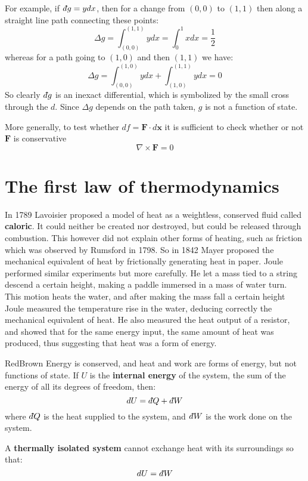\documentclass[a4paper,11pt,oneside]{book}
\newcommand{\dbar}{d\hspace*{-0.08em}\bar{}\hspace*{0.1em}}
\begin{document}
For example, if $\dbar g = y dx$, then for a change from $(0,0)$ to $(1,1)$ then along a straight line path connecting these points:
\begin{equation}
    \Delta g = \int_{(0,0)}^{(1,1)} y dx = \int_0^1 x dx = \frac{1}{2}
\end{equation}
whereas for a path going to $(1,0)$ and then $(1,1)$ we have:
\begin{equation}
    \Delta g = \int_{(0,0)}^{(1,0)} y dx+\int_{(1,0)}^{(1,1)} y dx = 0
\end{equation}
So clearly $\dbar g$ is an inexact differential, which is symbolized by the small cross through the $d$. Since $\Delta g$ depends on the path taken, $g$ is not a function of state. 

More generally, to test whether $df = \textbf{F} \cdot d\textbf{x}$ it is sufficient to check whether or not $\textbf{F}$ is conservative
\begin{equation}
    \nabla \times \textbf{F} = 0
\end{equation}

\section{The first law of thermodynamics}
In 1789 Lavoisier proposed a model of heat as a weightless, conserved fluid called \textbf{caloric}. It could neither be created nor destroyed, but could be released through combustion.
This however did not explain other forms of heating, such as friction which was observed by Rumsford in 1798. So in 1842 Mayer proposed the mechanical equivalent of heat by frictionally generating heat in paper. Joule performed similar experiments but more carefully. He let a mass tied to a string descend a certain height, making a paddle immersed in a mass of water turn. This motion heats the water, and after making the mass fall a certain height Joule measured the temperature rise in the water, deducing correctly the mechanical equivalent of heat. 
He also measured the heat output of a resistor, and showed that for the same energy input, the same amount of heat was produced, thus suggesting that heat was a form of energy. 

\begin{mybox}{RedBrown}{\textbf{}}
Energy is conserved, and heat and work are forms of energy, but not functions of state. If $U$ is the \textbf{internal energy} of the system, the sum of the energy of all its degrees of freedom, then:
\begin{equation}
    dU = \dbar Q + \dbar W
\end{equation}
where $\dbar Q$ is the heat supplied to the system, and $\dbar W$ is the work done on the system. 
\end{mybox}
A \textbf{thermally isolated system} cannot exchange heat with its surroundings so that:
\begin{equation}
    dU = \dbar W
\end{equation}
\end{document}
